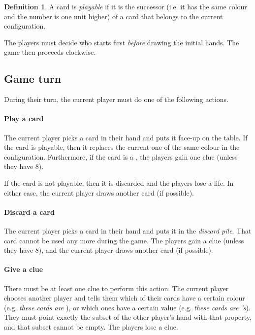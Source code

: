 \documentclass[a4paper]{article}
\theoremstyle{plain}
\theoremstyle{definition}
\newtheorem{definition}[theorem]{Definition}
\begin{document}
\begin{definition}
	A card is \textit{playable} if it is the successor (i.e. it has the same colour and the number is one unit higher) of a card that belongs to the current configuration.
\end{definition}

The players must decide who starts first \textit{before} drawing the initial hands. The game then proceeds clockwise.

\subsection{Game turn}

During their turn, the current player must do one of the following actions.

\paragraph{Play a card} The current player picks a card in their hand and puts it face-up on the table. If the card is playable, then it replaces the current one of the same colour in the configuration. Furthermore, if the card is a , the players gain one clue (unless they have 8).

If the card is not playable, then it is discarded and the players lose a life. In either case, the current player draws another card (if possible).

\paragraph{Discard a card} The current player picks a card in their hand and puts it in the \textit{discard pile}. That card cannot be used any more during the game. The players gain a clue (unless they have 8), and the current player draws another card (if possible).

\paragraph{Give a clue} There must be at least one clue to perform this action. The current player chooses another player and tells them which of their cards have a certain colour (e.g. \textit{these cards are }), or which ones have a certain value (e.g. \textit{these cards are 's}). They must point exactly the subset of the other player's hand with that property, and that subset cannot be empty. The players lose a clue.
\end{document}

